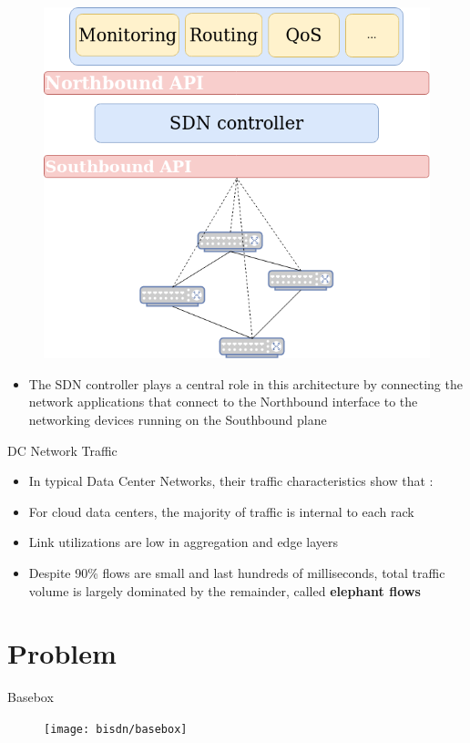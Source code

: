 \documentclass{beamer}
\begin{document}
\begin{frame}
    \begin{figure}[!tbph]
        \centering
        \includegraphics[width=.5\textwidth]{sdn/sdn_division}
    \end{figure}
    \begin{itemize}
        \item The SDN controller plays a central role in this architecture by connecting the network applications that connect to the Northbound interface to the
            networking devices running on the Southbound plane
    \end{itemize}
\end{frame}

\begin{frame}{DC Network Traffic}
    \begin{itemize}
        \item In typical Data Center Networks, their traffic characteristics show that \cite{mori_identifying_2004}:
            \pause
        \item For cloud data centers, the majority of traffic is internal to each rack
            \pause
        \item Link utilizations are low in aggregation and edge layers
            \pause
        \item Despite 90\% flows are small and last hundreds of milliseconds, total traffic volume is largely dominated by the remainder, called 
            \textbf{elephant flows} \cite{benson_network_2010}
    \end{itemize}
\end{frame}

\section{Problem}

\begin{frame}{Basebox}
    \begin{figure}
        \texttt{[image: bisdn/basebox]}
    \end{figure}
\end{frame}
\end{document}
